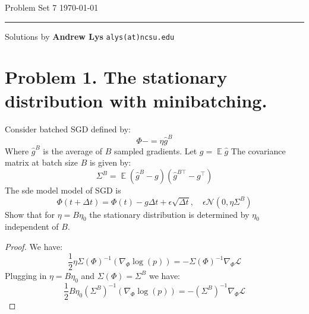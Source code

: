 \documentclass{amsart}
\newcommand{\cN}{\mathcal{N}}
\newcommand{\cL}{\mathcal{L}}
\DeclareMathOperator{\ee}{\mathbb{E}}
\theoremstyle{definition}
\begin{document}
\noindent
Problem Set 7  \hfill \today  %
\smallskip
\hrule
\smallskip
\noindent
Solutions by {\bf Andrew Lys} \qquad   %
  {\tt alys(at)ncsu.edu}

\vspace{0.5cm}

\section*{Problem 1. The stationary distribution with minibatching.}
Consider batched SGD defined by:
\[
\Phi -= \eta \hat{g}^B
\]
Where $\hat{g}^B$ is the average of $B$ sampled gradients. 
Let $g = \ee{\hat{g}}$
The covariance matrix at batch size $B$ is given by:
\[
\Sigma^B = \ee{(\hat{g}^B - g)(\hat{g}^{B\top} - g^\top)}
\]
The sde model model of SGD is 
\[
\Phi(t + \Delta t) = \Phi(t) - g\Delta t + \epsilon \sqrt{\Delta t}, \quad \epsilon \cN(0, \eta \Sigma^B)
\]
Show that for $\eta = B \eta_0$ the stationary distribution is determined by $\eta_0$ independent of $B$. 
\begin{proof}
    We have:
    \[
    \frac{1}{2}\eta \Sigma(\Phi)^{-1}(\nabla_\Phi \log(p)) = - \Sigma(\Phi)^{-1} \nabla_\Phi \cL
    \]
    Plugging in $\eta = B \eta_0$ and $\Sigma(\Phi) = \Sigma^B$ we have:
    \[
    \frac{1}{2}B \eta_0 (\Sigma^B)^{-1}(\nabla_\Phi \log(p)) = - (\Sigma^B)^{-1} \nabla_\Phi \cL
    \]
\end{proof}
\end{document}
